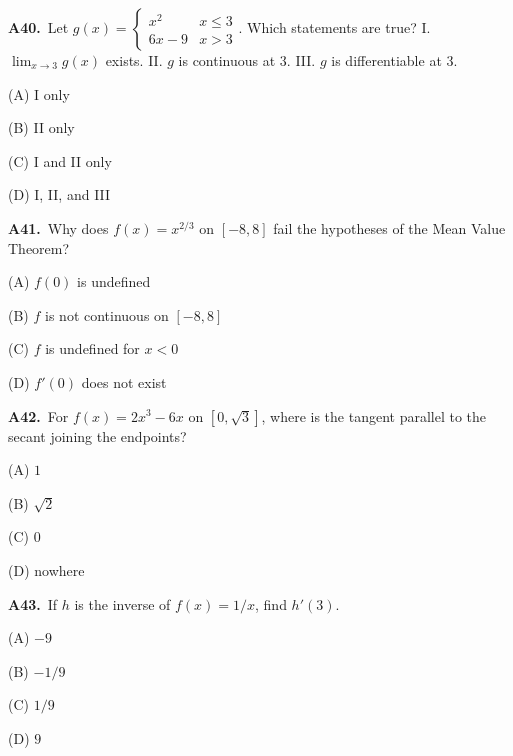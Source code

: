 \documentclass[11pt]{article}
\begin{document}
\bigskip\noindent\textbf{A40.}\ Let $g(x)=\begin{cases}x^2&x\le3\\6x-9&x>3\end{cases}$. Which statements are true? I. $\lim_{x\to3}g(x)$ exists. II. $g$ is continuous at $3$. III. $g$ is differentiable at $3$.
\begin{list}{}{\setlength{\leftmargin}{3em}\setlength{\labelwidth}{2.5em}\setlength{\itemsep}{0pt}\setlength{\topsep}{2pt}}
\item[(A)] I only
\item[(B)] II only
\item[(C)] I and II only
\item[(D)] I, II, and III
\end{list}

\bigskip\noindent\textbf{A41.}\ Why does $f(x)=x^{2/3}$ on $[-8,8]$ fail the hypotheses of the Mean Value Theorem?
\begin{list}{}{\setlength{\leftmargin}{3em}\setlength{\labelwidth}{2.5em}\setlength{\itemsep}{0pt}\setlength{\topsep}{2pt}}
\item[(A)] $f(0)$ is undefined
\item[(B)] $f$ is not continuous on $[-8,8]$
\item[(C)] $f$ is undefined for $x<0$
\item[(D)] $f'(0)$ does not exist
\end{list}

\bigskip\noindent\textbf{A42.}\ For $f(x)=2x^3-6x$ on $[0,\sqrt3]$, where is the tangent parallel to the secant joining the endpoints?
\begin{list}{}{\setlength{\leftmargin}{3em}\setlength{\labelwidth}{2.5em}\setlength{\itemsep}{0pt}\setlength{\topsep}{2pt}}
\item[(A)] $1$
\item[(B)] $\sqrt2$
\item[(C)] $0$
\item[(D)] nowhere
\end{list}

\bigskip\noindent\textbf{A43.}\ If $h$ is the inverse of $f(x)=1/x$, find $h'(3)$.
\begin{list}{}{\setlength{\leftmargin}{3em}\setlength{\labelwidth}{2.5em}\setlength{\itemsep}{0pt}\setlength{\topsep}{2pt}}
\item[(A)] $-9$
\item[(B)] $-1/9$
\item[(C)] $1/9$
\item[(D)] $9$
\end{list}
\end{document}
